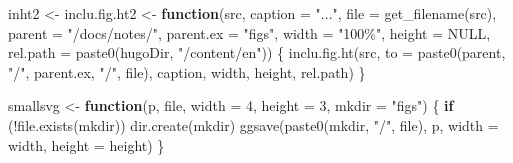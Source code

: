 \documentclass[
]{article}
\newenvironment{Shaded}{\begin{snugshade}}{\end{snugshade}}
\newcommand{\AttributeTok}[1]{\textcolor[rgb]{0.77,0.63,0.00}{#1}}
\newcommand{\ConstantTok}[1]{\textcolor[rgb]{0.00,0.00,0.00}{#1}}
\newcommand{\ControlFlowTok}[1]{\textcolor[rgb]{0.13,0.29,0.53}{\textbf{#1}}}
\newcommand{\DecValTok}[1]{\textcolor[rgb]{0.00,0.00,0.81}{#1}}
\newcommand{\FunctionTok}[1]{\textcolor[rgb]{0.00,0.00,0.00}{#1}}
\newcommand{\NormalTok}[1]{#1}
\newcommand{\OtherTok}[1]{\textcolor[rgb]{0.56,0.35,0.01}{#1}}
\newcommand{\SpecialCharTok}[1]{\textcolor[rgb]{0.00,0.00,0.00}{#1}}
\newcommand{\StringTok}[1]{\textcolor[rgb]{0.31,0.60,0.02}{#1}}
\begin{document}
\begin{Shaded}
\begin{Highlighting}[]
\NormalTok{inht2 }\OtherTok{\textless{}{-}}\NormalTok{ inclu.fig.ht2 }\OtherTok{\textless{}{-}} \ControlFlowTok{function}\NormalTok{(src, }\AttributeTok{caption =} \StringTok{"..."}\NormalTok{,}
  \AttributeTok{file =} \FunctionTok{get\_filename}\NormalTok{(src), }\AttributeTok{parent =} \StringTok{"/docs/notes/"}\NormalTok{,}
  \AttributeTok{parent.ex =} \StringTok{"figs"}\NormalTok{, }\AttributeTok{width =} \StringTok{"100\%"}\NormalTok{, }\AttributeTok{height =} \ConstantTok{NULL}\NormalTok{,}
  \AttributeTok{rel.path =} \FunctionTok{paste0}\NormalTok{(hugoDir, }\StringTok{"/content/en"}\NormalTok{))}
\NormalTok{\{}
  \FunctionTok{inclu.fig.ht}\NormalTok{(src, }\AttributeTok{to =} \FunctionTok{paste0}\NormalTok{(parent, }\StringTok{"/"}\NormalTok{, parent.ex, }\StringTok{"/"}\NormalTok{, file), caption,}
\NormalTok{    width, height, rel.path)}
\NormalTok{\}}

\NormalTok{smallsvg }\OtherTok{\textless{}{-}} \ControlFlowTok{function}\NormalTok{(p, file, }\AttributeTok{width =} \DecValTok{4}\NormalTok{, }\AttributeTok{height =} \DecValTok{3}\NormalTok{, }\AttributeTok{mkdir =} \StringTok{"figs"}\NormalTok{) \{}
  \ControlFlowTok{if}\NormalTok{ (}\SpecialCharTok{!}\FunctionTok{file.exists}\NormalTok{(mkdir))}
    \FunctionTok{dir.create}\NormalTok{(mkdir)}
  \FunctionTok{ggsave}\NormalTok{(}\FunctionTok{paste0}\NormalTok{(mkdir, }\StringTok{"/"}\NormalTok{, file), p, }\AttributeTok{width =}\NormalTok{ width, }\AttributeTok{height =}\NormalTok{ height)}
\NormalTok{\}}


\end{Highlighting}
\end{Shaded}
\end{document}
